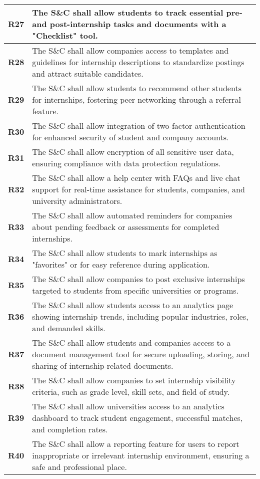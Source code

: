 \begin{longtable}{|p{}|p{}|}
\hline
\textbf{R27} & The S\&C shall allow students to track essential pre- and post-internship tasks and documents with a "Checklist" tool. \\ 
\hline
\textbf{R28} & The S\&C shall allow companies access to templates and guidelines for internship descriptions to standardize postings and attract suitable candidates. \\ 
\hline
\textbf{R29} & The S\&C shall allow students to recommend other students for internships, fostering peer networking through a referral feature. \\ 
\hline
\textbf{R30} & The S\&C shall allow integration of two-factor authentication for enhanced security of student and company accounts. \\ 
\hline
\textbf{R31} & The S\&C shall allow encryption of all sensitive user data, ensuring compliance with data protection regulations. \\ 
\hline
\textbf{R32} & The S\&C shall allow a help center with FAQs and live chat support for real-time assistance for students, companies, and university administrators. \\ 
\hline
\textbf{R33} & The S\&C shall allow automated reminders for companies about pending feedback or assessments for completed internships. \\ 
\hline
\textbf{R34} & The S\&C shall allow students to mark internships as "favorites" or for easy reference during application. \\ 
\hline
\textbf{R35} & The S\&C shall allow companies to post exclusive internships targeted to students from specific universities or programs. \\ 
\hline
\textbf{R36} & The S\&C shall allow students access to an analytics page showing internship trends, including popular industries, roles, and demanded skills. \\ 
\hline
\textbf{R37} & The S\&C shall allow students and companies access to a document management tool for secure uploading, storing, and sharing of internship-related documents. \\ 
\hline
\textbf{R38} & The S\&C shall allow companies to set internship visibility criteria, such as grade level, skill sets, and field of study. \\ 
\hline
\textbf{R39} & The S\&C shall allow universities access to an analytics dashboard to track student engagement, successful matches, and completion rates. \\ 
\hline
\textbf{R40} & The S\&C shall allow a reporting feature for users to report inappropriate or irrelevant internship environment, ensuring a safe and professional place. \\ 

\end{longtable}
